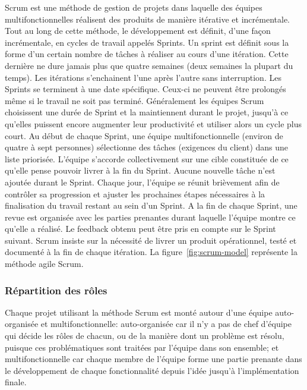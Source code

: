 Scrum est une méthode de gestion de projets dans laquelle des équipes
multifonctionnelles réalisent des produits de manière itérative et
incrémentale. Tout au long de cette méthode, le développement est définit,
d'une façon incrémentale, en cycles de travail appelés Sprints. Un sprint est
définit sous la forme d'un certain nombre de tâches à réaliser au cours d'une
itération. Cette dernière ne dure jamais plus que quatre semaines (deux
semaines la plupart du temps). Les itérations s'enchainent l'une après l'autre
sans interruption. Les Sprints se terminent à une date spécifique. Ceux-ci ne
peuvent être prolongés même si le travail ne soit pas terminé. Généralement les
équipes Scrum choisissent une durée de Sprint et la maintiennent durant le
projet, jusqu'à ce qu'elles puissent encore augmenter leur productivité et
utiliser alors un cycle plus court. Au début de chaque Sprint, une équipe
multifonctionnelle (environ de quatre à sept personnes) sélectionne des tâches
(exigences du client) dans une liste priorisée. L'équipe s'accorde
collectivement sur une cible constituée de ce qu'elle pense pouvoir livrer à la
fin du Sprint. Aucune nouvelle tâche n'est ajoutée durant le Sprint. Chaque
jour, l'équipe se réunit brièvement afin de contrôler sa progression et ajuster
les prochaines étapes nécessaires à la finalisation du travail restant au sein
d'un Sprint. A la fin de chaque Sprint, une revue est organisée avec les
parties prenantes durant laquelle l'équipe montre ce qu'elle a réalisé. Le
feedback obtenu peut être pris en compte sur le Sprint suivant. Scrum insiste
sur la nécessité de livrer un produit opérationnel, testé et documenté à la fin
de chaque itération. La figure~\ref{fig:scrum-model} représente la méthode
agile Scrum.



\subsubsection{Répartition des rôles}

Chaque projet utilisant la méthode Scrum est monté autour d'une équipe
auto-organisée et multifonctionnelle: auto-organisée car il n'y a pas de chef
d'équipe qui décide les rôles de chacun, ou de la manière dont un problème est
résolu, puisque ces problématiques sont traitées par l'équipe dans son
ensemble; et multifonctionnelle car chaque membre de l'équipe forme une partie
prenante dans le développement de chaque fonctionnalité depuis l'idée jusqu'à
l'implémentation finale.

